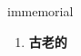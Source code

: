 
\begin{frame}
{\huge immemorial}
\begin{center}
\begin{enumerate}\Large
  \item \textbf{古老的}
\end{enumerate}
\end{center}
\end{frame}
